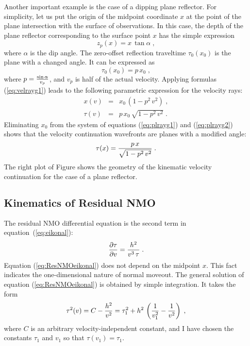 Another important example is the case of a dipping plane reflector. For
simplicity, let us put the origin of the midpoint coordinate $x$ at the point
of the plane intersection with the surface of observations. In this case, the
depth of the plane reflector corresponding to the surface point $x$ has the
simple expression
\begin{equation}
z_p(x) = x\,\tan{\alpha}\;,
\label{eq:plane}
\end{equation}
where $\alpha$ is the dip angle. The zero-offset reflection traveltime
$\tau_0(x_0)$ 
is the plane with a changed angle. It can be expressed as
\begin{equation}
\tau_0(x_0) = p\,x_0\;,
\label{eq:plt0}
\end{equation}
where $p = {{\sin{\alpha}}\over v_p}$, and $v_p$ is half of the actual
velocity. Applying formulas (\ref{eq:velrayg1}) leads to the following
parametric expression for the velocity rays:
\begin{eqnarray}
x(v) & = & x_0\,(1 -  p^2\,v^2)\;,
\label{eq:plrayg1} \\ 
\tau(v) & = & p\,x_0\,\sqrt{1 -  p^2\,v^2}\;.
\label{eq:plrayg2} 
\end{eqnarray}
Eliminating $x_0$ from the system of equations (\ref{eq:plrayg1}) and
(\ref{eq:plrayg2}) shows that the velocity continuation wavefronts are
planes with a modified angle:
\begin{equation}
\tau(x)={{p\,x} \over {\sqrt{1 -  p^2\,v^2}}}\;.
\label{eq:plfront}
\end{equation}
The right plot of Figure  shows the geometry of the
kinematic velocity continuation for the case of a plane reflector.

\subsection{Kinematics of Residual NMO}
The residual NMO differential equation is the second term in
equation~(\ref{eq:eikonal}):
\begin{equation}
{{\partial \tau} \over {\partial v}} = 
{{h^2} \over {v^3\,\tau}}\;.
\label{eq:ResNMOeikonal} 
\end{equation}
Equation (\ref{eq:ResNMOeikonal}) does not depend on the midpoint
$x$. This fact indicates the one-dimensional nature of normal
moveout. The general solution of equation (\ref{eq:ResNMOeikonal}) is
obtained by simple integration. It takes the form
\begin{equation}
\tau^2(v) = C - {h^2 \over v^2} = \tau_1^2 + 
h^2\,\left({1 \over v_1^2} - {1 \over v^2}\right)\;,
\label{eq:ResNMO} 
\end{equation}
where $C$ is an arbitrary velocity-independent constant, and I have chosen the
constants $\tau_1$ and $v_1$ so that $\tau(v_1) = \tau_1$.

